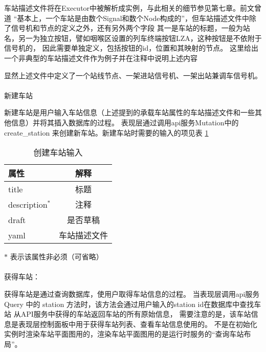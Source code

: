 车站描述文件将在Executor中被解析成实例，与此相关的细节参见第七章。前文曾道
“基本上，一个车站是由数个Signal和数个Node构成的”，但车站描述文件中除了信号机和节点的定义之外，还有另外两个字段
其一是车站的标题，一般为站名，另一为独立按钮，譬如咽喉区设置的列车终端按钮LZA，这种按钮是不依附于信号机的，
因此需要单独定义，包括按钮的id，位置和其映射的节点。
这里给出一个非典型的车站描述文件作为例子并在注释中说明上述内容

显然上述文件中定义了一个站线节点、一架进站信号机、一架出站兼调车信号机。

\paragraph{}新建车站

新建车站是用户输入车站信息（上述提到的承载车站属性的车站描述文件和一些其他信息）并将其插入数据库的过程。
表现层通过调用api服务Mutation中的 create\_station 来创建新车站。新建车站时需要的输入的项见表 \ref{create_sta_in}

\begin{table}[htpb!]
    \centering
    \caption{\label{create_sta_in}创建车站输入}
    \begin{threeparttable}
        \begin{tabular}{lc}
            \toprule
            属性            & 解释         \\
            \midrule
            title           & 标题         \\
            description$^*$ & 注释         \\
            draft           & 是否草稿     \\
            yaml            & 车站描述文件 \\
            \bottomrule
        \end{tabular}
        \begin{tablenotes}
            \footnotesize
            \item[$*$] 表示该属性非必须（可省略）
        \end{tablenotes}
    \end{threeparttable}
\end{table}

\paragraph{}获得车站：

获得车站是通过查询数据库，使用户取得车站信息的过程。
当表现层调用api服务 Query 中的 station 方法时，该方法会通过用户输入的station id在数据库中查找车站
从API服务中获得的车站返回车站的所有原始信息，
需要注意的是，该车站信息是表现层控制面板中用于获得车站列表、查看车站信息使用的。
不是在初始化实例时渲染车站平面图用的，渲染车站平面图用的是运行时服务的“查询车站布局”。

